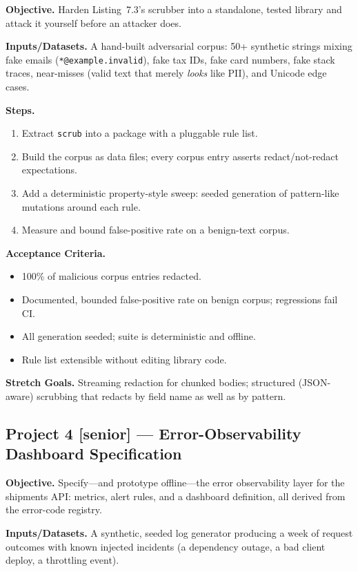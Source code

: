 \textbf{Objective.} Harden Listing~7.3's scrubber into a standalone,
tested library and attack it yourself before an attacker does.

\textbf{Inputs/Datasets.} A hand-built adversarial corpus: 50+ synthetic
strings mixing fake emails (\texttt{*@example.invalid}), fake tax IDs, fake
card numbers, fake stack traces, near-misses (valid text that merely
\emph{looks} like PII), and Unicode edge cases.

\textbf{Steps.}
\begin{enumerate}
  \item Extract \texttt{scrub} into a package with a pluggable rule list.
  \item Build the corpus as data files; every corpus entry asserts
        redact/not-redact expectations.
  \item Add a deterministic property-style sweep: seeded generation of
        pattern-like mutations around each rule.
  \item Measure and bound false-positive rate on a benign-text corpus.
\end{enumerate}

\textbf{Acceptance Criteria.}
\begin{itemize}
  \item[$\square$] 100\% of malicious corpus entries redacted.
  \item[$\square$] Documented, bounded false-positive rate on benign
        corpus; regressions fail CI.
  \item[$\square$] All generation seeded; suite is deterministic and
        offline.
  \item[$\square$] Rule list extensible without editing library code.
\end{itemize}

\textbf{Stretch Goals.} Streaming redaction for chunked bodies; structured
(JSON-aware) scrubbing that redacts by field name as well as by pattern.

\subsection{Project 4 [senior] --- Error-Observability Dashboard Specification}

\textbf{Objective.} Specify---and prototype offline---the error
observability layer for the shipments API: metrics, alert rules, and a
dashboard definition, all derived from the error-code registry.

\textbf{Inputs/Datasets.} A synthetic, seeded log generator producing a week
of request outcomes with known injected incidents (a dependency outage, a
bad client deploy, a throttling event).

